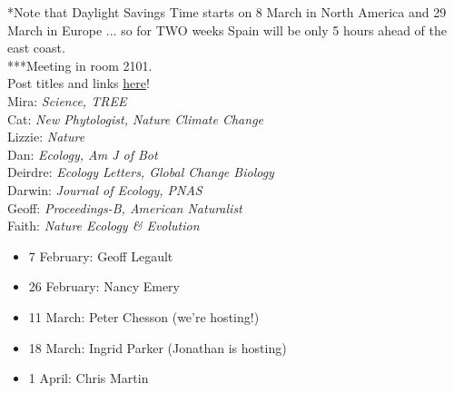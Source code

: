 \documentclass[11pt]{article}
\newenvironment{smitemize}{
\begin{itemize}
  \setlength{\itemsep}{0pt}
  \setlength{\parskip}{0.8pt}
  \setlength{\parsep}{0pt}}
{\end{itemize}
}
\begin{document}
*Note that Daylight Savings Time starts on 8 March in North America and 29 March in Europe ... so for TWO weeks Spain will be only 5 hours ahead of the east coast.\\
***Meeting in room 2101.
\vspace{7pt}\\
 Post titles and links \href{https://docs.google.com/document/d/1j0WdDbjdp8ERLSO7whvtnP-tOblYMlX33TSCXy_uRKo/edit?usp=sharing}{\underline{here}}!\\
Mira: \emph{Science, TREE} \\
Cat: \emph{New Phytologist, Nature Climate Change}\\
Lizzie: \emph{Nature}\\
Dan: \emph{Ecology, Am J of Bot }\\
Deirdre: \emph{Ecology Letters, Global Change Biology}\\
Darwin: \emph{Journal of Ecology, PNAS}\\
Geoff: \emph{Proceedings-B, American Naturalist} \\
Faith: \emph{Nature Ecology \& Evolution}\\

\vspace{-1ex}
\begin{smitemize}
\item 7 February: Geoff Legault
\item 26 February: Nancy Emery
\item 11 March: Peter Chesson (we're hosting!)
\item 18 March: Ingrid Parker (Jonathan is hosting)
\item 1 April: Chris Martin
\end{smitemize}
\end{document}
